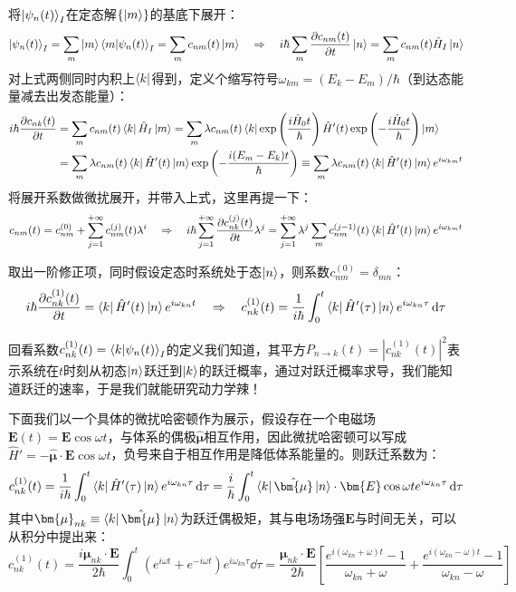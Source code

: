 将$\ket{\psi_n(t)}_I$在定态解$\{\ket{m}\}$的基底下展开：
\[\ket{\psi_n(t)}_I=\sum_m\ket{m}\bra{m}\ket{\psi_n(t)}_I=\sum_mc_{nm}(t)\ket{m} \quad \Rightarrow \quad i\hbar\sum_m\pdv{c_{nm}(t)}{t}\ket{n}=\sum_mc_{nm}(t)\hat{H}_I\ket{n}\]
对上式两侧同时内积上$\bra{k}$得到，定义个缩写符号$\omega_{km}=(E_k-E_m)/\hbar$（到达态能量减去出发态能量）：
\[\begin{aligned}
i\hbar\pdv{c_{nk}(t)}{t}&=\sum_mc_{nm}(t)\bra{k}\hat{H}_I\ket{m}=\sum_m\lambda c_{nm}(t)\bra{k}\exp\left(\frac{i\hat{H}_0t}{\hbar}\right)\hat{H}'(t)\exp\left(-\frac{i\hat{H}_0t}{\hbar}\right)\ket{m}\\
&=\sum_m\lambda c_{nm}(t)\bra{k}\hat{H}'(t)\ket{m}\exp\left(-\frac{i(E_m-E_k)t}{\hbar}\right)\equiv\sum_m\lambda c_{nm}(t)\bra{k}\hat{H}'(t)\ket{m}e^{i\omega_{km}t}
\end{aligned}\]
将展开系数做微扰展开，并带入上式，这里再提一下：
\[c_{nm}(t)=c_{nm}^{(0)}+\sum_{j=1}^{+\infty}c_{nm}^{(j)}(t)\lambda^i \quad \Rightarrow \quad i\hbar\sum_{j=1}^{+\infty}\pdv{c_{nk}^{(j)}(t)}{t}\lambda^j=\sum_{j=1}^{+\infty}\lambda^j\sum_mc^{(j-1)}_{nm}(t)\bra{k}\hat{H}'(t)\ket{m}e^{i\omega_{km}t}\]

取出一阶修正项，同时假设定态时系统处于态$\ket{n}$，则系数$c^{(0)}_{nm}=\delta_{mn}$：
\[i\hbar\pdv{c_{nk}^{(1)}(t)}{t}=\bra{k}\hat{H}'(t)\ket{n}e^{i\omega_{kn}t} \quad \Rightarrow \quad c_{nk}^{(1)}(t)=\frac{1}{i\hbar}\int_{0}^{t}\bra{k}\hat{H}'(\tau)\ket{n}e^{i\omega_{kn}\tau}\dd{\tau}\]

回看系数$c_{nk}^{(1)}(t)=\bra{k}\ket{\psi_n(t)}_I$的定义我们知道，其平方$P_{n \to k}(t)=|c_{nk}^{(1)}(t)|^2$表示系统在$t$时刻从初态$\ket{n}$跃迁到$\ket{k}$的跃迁概率，通过对跃迁概率求导，我们能知道跃迁的速率，于是我们就能研究动力学辣！

下面我们以一个具体的微扰哈密顿作为展示，假设存在一个电磁场$\bm{E}(t)=\bm{E}\cos{\omega t}$，与体系的偶极$\hat{\bm{\mu}}$相互作用，因此微扰哈密顿可以写成$\hat{H}'=-\hat{\bm{\mu}}\cdot\bm{E}\cos{\omega t}$，负号来自于相互作用是降低体系能量的。则跃迁系数为：
\[c_{nk}^{(1)}(t)=\frac{1}{i\hbar}\int_{0}^{t}\bra{k}\hat{H}'(\tau)\ket{n}e^{i\omega_{kn}\tau}\dd{\tau}=\frac{i}{\hbar}\int_{0}^{t}\bra{k}\hat{\bm{\mu}}\ket{n}\cdot \bm{E}\cos{\omega t}e^{i\omega_{kn}\tau}\dd{\tau}\]
其中$\bm{\mu}_{nk}\equiv\bra{k}\hat{\bm{\mu}}\ket{n}$为跃迁偶极矩，其与电场场强$\bm{E}$与时间无关，可以从积分中提出来：
\[c_{nk}^{(1)}(t)=\frac{i\bm{\mu}_{nk}\cdot\bm{E}}{2\hbar}\int_{0}^{t}(e^{i\omega t}+e^{-i\omega t})e^{i\omega_{kn}\tau}\dd{\tau}=\frac{\bm{\mu}_{nk}\cdot\bm{E}}{2\hbar}\left[\frac{e^{i(\omega_{kn}+\omega)t}-1}{\omega_{kn}+\omega}+\frac{e^{i(\omega_{kn}-\omega)t}-1}{\omega_{kn}-\omega} \right]\]

